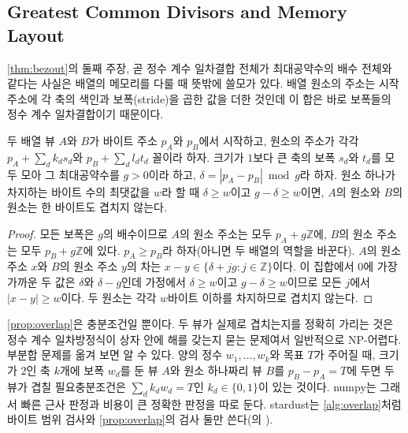 \subsection{Greatest Common Divisors and Memory Layout}

\cref{thm:bezout}의 둘째 주장, 곧 정수 계수 일차결합 전체가 최대공약수의 배수 전체와 같다는 사실은 배열의 메모리를 다룰 때 뜻밖에 쓸모가 있다. 배열 원소의 주소는 시작 주소에 각 축의 색인과 보폭(stride)을 곱한 값을 더한 것인데 이 합은 바로 보폭들의 정수 계수 일차결합이기 때문이다.

\begin{proposition}
\label{prop:overlap}
두 배열 뷰 $A$와 $B$가 바이트 주소 $p_A$와 $p_B$에서 시작하고, 원소의 주소가 각각 $p_A+\sum_d k_d s_d$와 $p_B+\sum_d l_d t_d$ 꼴이라 하자. 크기가 $1$보다 큰 축의 보폭 $s_d$와 $t_d$를 모두 모아 그 최대공약수를 $g>0$이라 하고, $\delta=|p_A-p_B|\bmod g$라 하자. 원소 하나가 차지하는 바이트 수의 최댓값을 $w$라 할 때 $\delta\ge w$이고 $g-\delta\ge w$이면, $A$의 원소와 $B$의 원소는 한 바이트도 겹치지 않는다.
\end{proposition}

\begin{proof}
모든 보폭은 $g$의 배수이므로 $A$의 원소 주소는 모두 $p_A+g\mathbb{Z}$에, $B$의 원소 주소는 모두 $p_B+g\mathbb{Z}$에 있다. $p_A\ge p_B$라 하자(아니면 두 배열의 역할을 바꾼다). $A$의 원소 주소 $x$와 $B$의 원소 주소 $y$의 차는 $x-y\in\{\delta+jg:j\in\mathbb{Z}\}$이다. 이 집합에서 $0$에 가장 가까운 두 값은 $\delta$와 $\delta-g$인데 가정에서 $\delta\ge w$이고 $g-\delta\ge w$이므로 모든 $j$에서 $|x-y|\ge w$이다. 두 원소는 각각 $w$바이트 이하를 차지하므로 겹치지 않는다.
\end{proof}

\cref{prop:overlap}은 충분조건일 뿐이다. 두 뷰가 실제로 겹치는지를 정확히 가리는 것은 정수 계수 일차방정식이 상자 안에 해를 갖는지 묻는 문제여서 일반적으로 NP-어렵다. 부분합 문제를 옮겨 보면 알 수 있다. 양의 정수 $w_1,\dots,w_k$와 목표 $T$가 주어질 때, 크기가 $2$인 축 $k$개에 보폭 $w_d$를 둔 뷰 $A$와 원소 하나짜리 뷰 $B$를 $p_B-p_A=T$에 두면 두 뷰가 겹칠 필요충분조건은 $\sum_dk_dw_d=T$인 $k_d\in\{0,1\}$이 있는 것이다. numpy는 그래서 빠른 근사 판정과 비용이 큰 정확한 판정을 따로 둔다. stardust는 \cref{alg:overlap}처럼 바이트 범위 검사와 \cref{prop:overlap}의 검사 둘만 쓴다(의 ).

